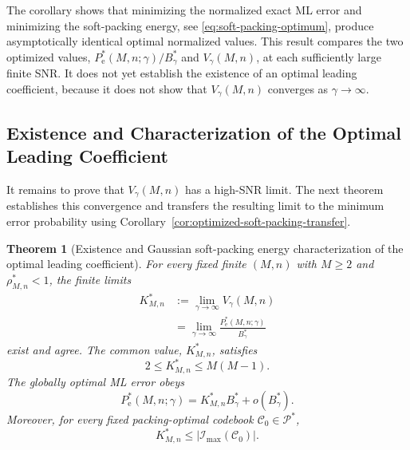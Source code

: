 \documentclass[12pt,draftclsnofoot,onecolumn]{IEEEtran}
\newcommand{\cC}{\mathcal{C}}
\newcommand{\cI}{\mathcal{I}}
\newcommand{\cP}{\mathcal{P}}
\newcommand{\Pe}{P_{\mathrm e}}
\newtheorem{theorem}{Theorem}
\theoremstyle{definition}
\begin{document}
The corollary shows that
minimizing the normalized exact ML error and minimizing the soft-packing energy, see \eqref{eq:soft-packing-optimum},
produce asymptotically identical optimal normalized values.  This result
compares the two optimized values,
\(\Pe^{\ast}(M,n;\gamma)/B_\gamma^{\ast}\) and \(V_\gamma(M,n)\), at each
sufficiently large finite SNR.
It does not yet establish the existence of an
optimal leading coefficient, because it does not show that
\(V_\gamma(M,n)\) converges as \(\gamma\to\infty\).

\subsection{Existence and Characterization of the Optimal Leading Coefficient}
\label{subsec:global-coefficient-attainment}



It remains to prove that \(V_\gamma(M,n)\) has a high-SNR limit.
The next theorem establishes this convergence and transfers the
resulting limit to the minimum error probability using
Corollary~\ref{cor:optimized-soft-packing-transfer}.

\begin{theorem}[Existence and Gaussian soft-packing energy characterization of the optimal leading coefficient]
\label{thm:global-coefficient}
For every fixed finite \((M,n)\) with \(M\ge2\) and
\(\rho^{\ast}_{M,n}<1\), the finite limits
\begin{equation}
\begin{aligned}
  K^{\ast}_{M,n}
  &:=\lim_{\gamma\to\infty}V_\gamma(M,n)\\
  &=\lim_{\gamma\to\infty}
  \frac{\Pe^{\ast}(M,n;\gamma)}{B_\gamma^{\ast}}
\end{aligned}
  \label{eq:Kstar-soft-packing-limit}
\end{equation}
exist and agree.  The common value, \(K^{\ast}_{M,n}\), satisfies
\begin{equation}
  2\le K^{\ast}_{M,n}\le M(M-1).
  \label{eq:Kstar-elementary-bounds}
\end{equation}
The globally optimal ML error obeys
\begin{equation}
  \Pe^{\ast}(M,n;\gamma)
  =K^{\ast}_{M,n}B_\gamma^{\ast}+o(B_\gamma^{\ast}).
  \label{eq:global-main}
\end{equation}
Moreover, for every fixed packing-optimal codebook \(\cC_0\in\cP^{\ast}\),
\begin{equation}
  K^{\ast}_{M,n}\le |\cI_{\max}(\cC_0)|.
  \label{eq:Kstar-fixed-packing-upper}
\end{equation}
\end{theorem}
\end{document}
